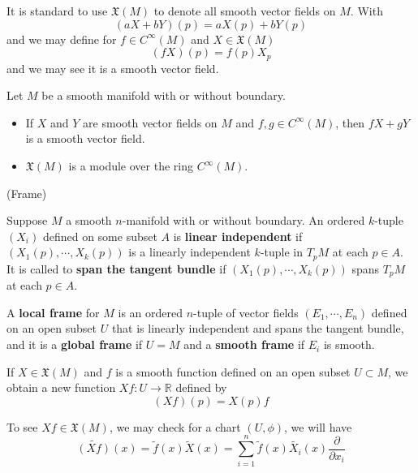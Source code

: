 \begin{definition}
    It is standard to use $\mathfrak{X}(M)$ to denote all smooth vector fields on $M$. With
    \[(aX+bY)(p) = aX(p) + bY(p)\]
    and we may define for $f\in C^{\infty}(M)$ and $X\in \mathfrak{X}(M)$
    \[(fX)(p) = f(p)X_p\]
    and we may see it is a smooth vector field. 
\end{definition}

\begin{proposition}
    Let $M$ be a smooth manifold with or without boundary.
    \begin{itemize}
        \item If $X$ and $Y$ are smooth vector fields on $M$ and $f,g\in C^{\infty}(M)$, then $fX+gY$ is a smooth vector field.
        \item $\mathfrak{X}(M)$ is a module over the ring $C^{\infty}(M)$.
    \end{itemize}
\end{proposition}

\begin{definition}(Frame)\par
    Suppose $M$ a smooth $n$-manifold with or without boundary. An ordered $k$-tuple $(X_i)$ defined on some subset $A$ is \textbf{linear independent} if $(X_1(p),\cdots,X_k(p))$ is a linearly independent $k$-tuple in $T_pM$ at each $p\in A$. It is called to \textbf{span the tangent bundle} if $(X_1(p),\cdots,X_k(p))$ spans $T_pM$ at each $p\in A$.\par
    A \textbf{local frame} for $M$ is an ordered $n$-tuple of vector fields $(E_1,\cdots,E_n)$ defined on an open subset $U$ that is linearly independent and spans the tangent bundle, and it is a \textbf{global frame} if $U=M$ and a \textbf{smooth frame} if $E_i$ is smooth.
\end{definition}

\begin{definition}
    If $X\in\mathfrak{X}(M)$ and $f$ is a smooth function defined on an open subset $U\subset M$, we obtain a new function $Xf:U\to\mathbb{R}$ defined by
    \[(Xf)(p) = X(p)f\]
\end{definition}
\Pf\par
    To see $Xf \in \mathfrak{X}(M)$, we may check for a chart $(U,\phi)$, we will have
    \[
    \widetilde{(Xf)}(x) = \tilde{f}(x)\widetilde{X}(x) =  \sum\limits_{i=1}^n \tilde{f}(x)\tilde{X_i}(x)\dfrac{\partial}{\partial x_i} 
    \]

